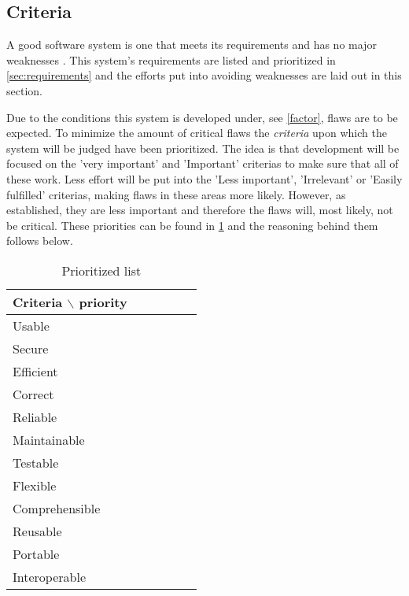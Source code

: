 \subsection{Criteria}\label{sec:architecturecriteria}
A good software system is one that meets its requirements and has no major weaknesses \citep[p.~179]{Rod-Aalborg}.
This system's requirements are listed and prioritized in \cref{sec:requirements} and the efforts put into avoiding weaknesses are laid out in this section.

Due to the conditions this system is developed under, see \cref{factor}, flaws are to be expected.
To minimize the amount of critical flaws the \textit{criteria} \citep[p.~180]{Rod-Aalborg} upon which the system will be judged have been prioritized.
The idea is that development will be focused on the 'very important' and 'Important' criterias to make sure that all of these work.
Less effort will be put into the 'Less important', 'Irrelevant' or 'Easily fulfilled' criterias, making flaws in these areas more likely.
However, as established, they are less important and therefore the flaws will, most likely, not be critical.
These priorities can be found in \cref{fig:criteria} and the reasoning behind them follows below.

\begin{table}[H]
	\begin{center}
		\begin{tabular}{|l|c|c|c|c|c|}
			\hline
			Criteria $\backslash$ priority & \rotatebox{90}{Very important} &  \rotatebox{90}{Important} & \rotatebox{90}{Less important} & \rotatebox{90}{Irrelevant} & \rotatebox{90}{Easily fulfilled}\\
			\hline
			Usable & \xmark & & & & \\
			\hline
			Secure & & & & \xmark & \\
			\hline
			Efficient & & & & & \xmark \\
			\hline
			Correct & & \xmark & & & \\
			\hline
			Reliable & \xmark & & & & \\
			\hline
			Maintainable & & & \xmark & & \\
			\hline
			Testable & & \xmark & & & \\
			\hline
			Flexible & & & & \xmark & \\
			\hline
			Comprehensible & & \xmark & & & \\
			\hline
			Reusable & & & \xmark & & \\
			\hline
			Portable & & & & \xmark & \\
			\hline
			Interoperable & & & & \xmark & \\
			\hline
		\end{tabular}
	\end{center}
	\caption{Prioritized list}\label{fig:criteria}
\end{table}

